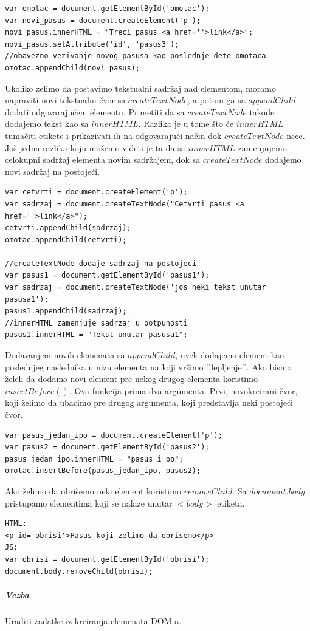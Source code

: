 \documentclass[a4paper]{article}
\begin{document}
\begin{lstlisting}[backgroundcolor = \color{lightgray}]
var omotac = document.getElementById('omotac');
var novi_pasus = document.createElement('p');
novi_pasus.innerHTML = "Treci pasus <a href=''>link</a>";
novi_pasus.setAttribute('id', 'pasus3');
//obavezno vezivanje novog pasusa kao poslednje dete omotaca
omotac.appendChild(novi_pasus);
\end{lstlisting}

Ukoliko zelimo da postavimo tekstualni sadržaj nad elementom, moramo napraviti novi tekstualni čvor sa $createTextNode$, a potom ga sa $appendChild$ dodati odgovarajućem elementu. Primetiti da sa $createTextNode$ takođe dodajemo tekst kao sa $innerHTML$. Razlika je u tome što će $innerHTML$ tumačiti etikete i prikazivati ih na odgovarajući način dok $createTextNode$ nece. Još jedna razlika koju možemo videti je ta da sa $innerHTML$ zamenjujemo celokupni sadržaj elementa novim sadržajem, dok sa $createTextNode$ dodajemo novi sadržaj na postojeći.

\begin{lstlisting}[backgroundcolor = \color{lightgray}]
var cetvrti = document.createElement('p');
var sadrzaj = document.createTextNode("Cetvrti pasus <a href=''>link</a>");
cetvrti.appendChild(sadrzaj);
omotac.appendChild(cetvrti);

//createTextNode dodaje sadrzaj na postojeci
var pasus1 = document.getElementById('pasus1');
var sadrzaj = document.createTextNode('jos neki tekst unutar pasusa1');
pasus1.appendChild(sadrzaj);
//innerHTML zamenjuje sadrzaj u potpunosti
pasus1.innerHTML = "Tekst unutar pasusa1";
\end{lstlisting}

Dodavanjem novih elemenata sa $appendChild$, uvek dodajemo element kao poslednjeg naslednika u nizu elementa na koji vršimo $"$lepljenje$"$. Ako bismo želeli da dodamo novi element pre nekog drugog elementa koristimo $insertBefore()$. Ova funkcija prima dva argumenta. Prvi, novokreirani čvor, koji želimo da ubacimo pre drugog argumenta, koji predstavlja neki postojeći čvor. 
\begin{lstlisting}[backgroundcolor = \color{lightgray}]
var pasus_jedan_ipo = document.createElement('p');
var pasus2 = document.getElementById('pasus2');
pasus_jedan_ipo.innerHTML = "pasus i po";
omotac.insertBefore(pasus_jedan_ipo, pasus2);
\end{lstlisting}

Ako želimo da obrišemo neki element koristimo $removeChild$. Sa $document.body$ pristupamo elementima koji se nalaze unutar $<body>$ etiketa.
\begin{lstlisting}[backgroundcolor = \color{lightgray}]
HTML:
<p id='obrisi'>Pasus koji zelimo da obrisemo</p>
JS:
var obrisi = document.getElementById('obrisi');
document.body.removeChild(obrisi);
\end{lstlisting}
\subparagraph{Vezba} Uraditi zadatke iz kreiranja elemenata DOM-a.
\end{document}

